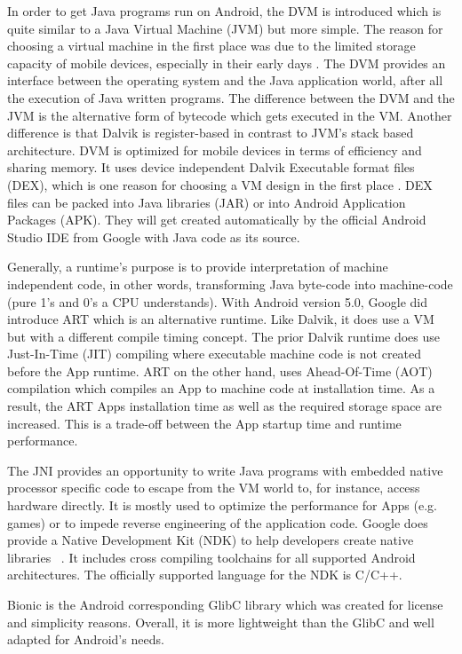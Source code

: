 In order to get Java programs run on Android, the DVM is introduced
which is quite similar to a Java Virtual Machine (JVM) but more simple.
The reason for choosing a virtual machine in the first place was due
to the limited storage capacity of mobile devices, especially in their early days \parencite[p.11f]{levin}.
The DVM provides an interface between the operating system and
the Java application world, after all the execution of Java written programs.
The difference between the DVM and the JVM is the alternative form of bytecode
which gets executed in the VM. Another difference is that Dalvik is
register-based in contrast to JVM's stack based architecture.
DVM is optimized for mobile devices
in terms of efficiency and sharing memory.
It uses device independent Dalvik Executable format files (DEX), which is one reason for choosing a VM design in the first place \parencite[p.11f]{levin}.
DEX files can be packed into Java libraries (JAR) or into Android Application Packages (APK). They will get created automatically by the official Android Studio IDE from Google with Java code as its source.

Generally, a runtime's purpose is to provide
interpretation of machine independent code, in other words,
transforming Java byte-code into machine-code (pure 1's and 0's a CPU understands).
With Android version 5.0, Google did introduce ART which is an
alternative runtime. Like Dalvik, it does use a VM but with a
different compile timing concept.
The prior Dalvik runtime does use Just-In-Time (JIT) compiling
where executable machine code is not created before the App runtime.
ART on the other hand, uses Ahead-Of-Time (AOT) compilation
which compiles an App to machine code at installation time.
As a result, the ART Apps installation time
as well as the required storage space are increased.
This is a trade-off between the App startup time and runtime performance.

The JNI provides an opportunity to write Java programs with embedded
native processor specific code to escape from the VM world to, for
instance, access hardware directly.
It is mostly used to optimize the performance for Apps (e.g. games)
or to impede reverse engineering of the application code.
Google does provide a Native Development Kit (NDK) to help
developers create native libraries ~\parencite{ndk}. It includes
cross compiling toolchains for all supported Android architectures.
The officially supported language for the NDK is C/C++.

Bionic is the Android corresponding GlibC library which was created
for license and simplicity reasons. Overall, it is more lightweight
than the GlibC and well adapted for Android's needs.

